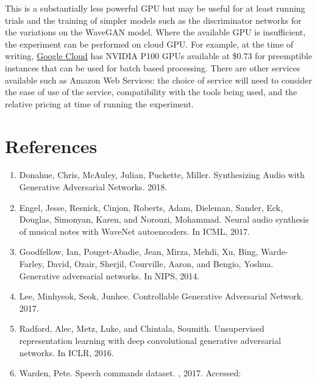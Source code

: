 \documentclass[titlepage]{article}
\begin{document}
This is a substantially less powerful GPU but may be useful for at least running trials and the training of simpler models such as the discriminator networks for the variations on the WaveGAN model.
\newline
\newline
Where the available GPU is insufficient, the experiment can be performed on cloud GPU.
For example, at the time of writing, \href{https://cloud.google.com/gpu/}{Google Cloud} has NVIDIA P100 GPUs available at \$0.73 for preemptible instances that can be used for batch based processing.
There are other services available such as Amazon Web Services: the choice of service will need to consider the ease of use of the service, compatibility with the tools being used, and the relative pricing at time of running the experiment.

\newpage
\section{References}

\begin{enumerate}

\item
  Donahue, Chris, McAuley, Julian, Puckette, Miller. Synthesizing Audio with Generative Adversarial Networks. 2018.
\item
  Engel, Jesse, Resnick, Cinjon, Roberts, Adam, Dieleman, Sander, Eck, Douglas, Simonyan, Karen, and Norouzi, Mohammad. Neural audio synthesis of musical notes with WaveNet autoencoders. In ICML, 2017.
\item
  Goodfellow, Ian, Pouget-Abadie, Jean, Mirza, Mehdi, Xu, Bing, Warde-Farley, David, Ozair, Sherjil, Courville, Aaron, and Bengio, Yoshua. Generative adversarial networks. In NIPS, 2014.
\item
  Lee, Minhyeok, Seok, Junhee. Controllable Generative Adversarial Network. 2017.
\item
  Radford, Alec, Metz, Luke, and Chintala, Soumith. Unsupervised representation learning with deep convolutional generative adversarial networks. In ICLR, 2016.
\item
  Warden, Pete. Speech commands dataset.
, 2017.
Accessed:

\end{enumerate}

\end{document}
